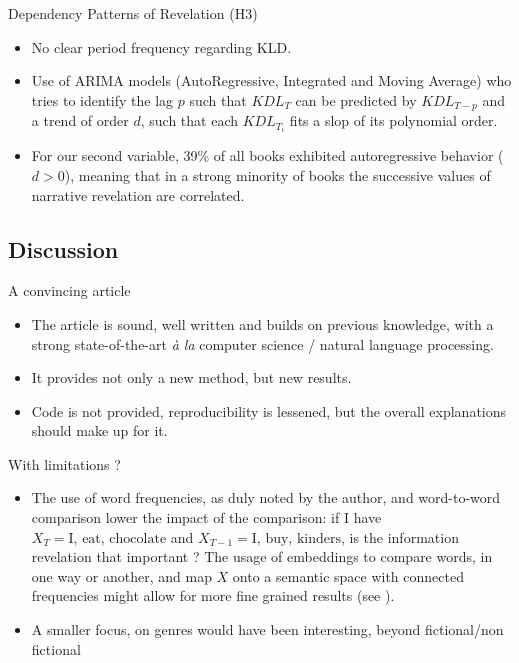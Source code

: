 \documentclass[aspectratio=169]{beamer}
\begin{document}
\begin{frame}{Dependency Patterns of Revelation (H3)}
    \begin{itemize}
        \item No clear period frequency regarding KLD.
        \item Use of ARIMA models (AutoRegressive, Integrated and Moving Average) who tries to identify the lag $p$ such that $KDL_{T}$ can be predicted by $KDL_{T-p}$ and a trend of order $d$, such that each $KDL_{T_{i}}$ fits a slop of its polynomial order.
        \item For our second variable, 39\% of all books exhibited autoregressive behavior ($d > 0$), meaning that in a strong minority of books the successive values of narrative revelation are correlated.
    \end{itemize}
\end{frame}


\subsection{Discussion}

\begin{frame}{A convincing article}
    \begin{itemize}
        \item The article is sound, well written and builds on previous knowledge, with a strong state-of-the-art \textit{à la} computer science / natural language processing.
        \item It provides not only a new method, but new results. 
        \item Code is not provided, reproducibility is lessened, but the overall explanations should make up for it.
    \end{itemize}
\end{frame}

\begin{frame}{With limitations ?}
    \begin{itemize}
        \item The use of word frequencies, as duly noted by the author, and word-to-word comparison lower the impact of the comparison: if I have $X_{T} = \text{I, eat, chocolate}$ and $X_{T-1} = \text{I, buy, kinders}$, is the information revelation that important ? The usage of embeddings to compare words, in one way or another, and map $X$ onto a semantic space with connected frequencies might allow for more fine grained results (see \cite{eder2022boostingwordfrequenciesauthorship}).
        \item A smaller focus, on genres would have been interesting, beyond fictional/non fictional
    \end{itemize}
\end{frame}
\end{document}
